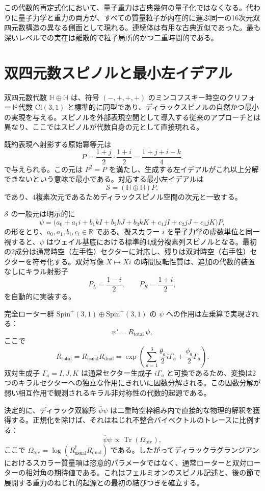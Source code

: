 \documentclass[a4paper]{article}
\begin{document}
この代数的再定式化において、量子重力は古典幾何の量子化ではなくなる。代わりに量子力学と重力の両方が、すべての質量粒子が内在的に運ぶ同一の16次元双四元数構造の異なる側面として現れる。連続体は有用な古典近似であった。最も深いレベルでの実在は離散的で粒子局所的かつ二重時間的である。

\section{双四元数スピノルと最小左イデアル}
\label{sec:spinor}

双四元数代数 $\mathbb{H} \oplus \mathbb{H}$ は、符号 $(-,+,+,+)$ のミンコフスキー時空のクリフォード代数 $\mathrm{Cl}(3,1)$ と標準的に同型であり、ディラックスピノルの自然かつ最小の実現を与える。スピノルを外部表現空間として導入する従来のアプローチとは異なり、ここではスピノルが代数自身の元として直接現れる。

既約表現へ射影する原始冪等元は
\[
P = \frac{1+j}{2} \cdot \frac{1+i}{2} = \frac{1 + j + i - k}{4}.
\]
で与えられる。この元は $P^2 = P$ を満たし、生成する左イデアルがこれ以上分解できないという意味で最小である。対応する最小左イデアルは
\[
\mathcal{S} = (\mathbb{H} \oplus \mathbb{H}) P,
\]
であり、4複素次元であるためディラックスピノル空間の次元と一致する。

$\mathcal{S}$ の一般元は明示的に
\[
\psi = \bigl( a_0 + a_1 i + b_1 kI + b_2 kJ + b_3 kK + c_1 jI + c_2 jJ + c_3 jK \bigr) P,
\]
の形をとり、$a_0,a_1,b_i,c_i \in \mathbb{R}$ である。擬スカラー $i$ を量子力学の虚数単位と同一視すると、$\psi$ はウェイル基底における標準的4成分複素列スピノルとなる。最初の2成分は通常時空（左手性）セクターに対応し、残りは双対時空（右手性）セクターを符号化する。双対写像 $X \mapsto X i$ の時間反転性質は、追加の代数的装置なしにキラル射影子
\[
P_L = \frac{1 - i}{2}, \qquad P_R = \frac{1 + i}{2},
\]
を自動的に実装する。

完全ローター群 $\mathrm{Spin}^+(3,1) \oplus \mathrm{Spin}^+(3,1)$ の $\psi$ への作用は左乗算で実現される：
\[
\psi' = R_\text{total} \, \psi,
\]
ここで
\[
R_\text{total} = R_\text{usual} R_\text{dual} = \exp\left( \sum_{a=1}^3 \frac{\theta_a}{2} i\Gamma_a + \frac{\phi_a}{2} \Gamma_a \right).
\]
双対生成子 $\Gamma_a = I,J,K$ は通常セクター生成子 $i\Gamma_a$ と可換であるため、変換は2つのキラルセクターへの独立な作用にきれいに因数分解される。この因数分解が弱い相互作用で観測されるキラル非対称性の代数的起源である。

決定的に、ディラック双線形 $\bar{\psi}\psi$ は二重時空枠組み内で直接的な物理的解釈を獲得する。正規化を除けば、それはねじれ不整合バイベクトルのトレースに比例する：
\[
\bar{\psi}\psi \propto \operatorname{Tr}(\Omega_\text{biv}),
\]
ここで $\Omega_\text{biv} = \log(R_\text{usual}^\dagger R_\text{dual})$ である。したがってディラックラグランジアンにおけるスカラー質量項は恣意的パラメータではなく、通常ローターと双対ローターの相対角の期待値である。これはフェルミオンのスピノル記述と、後の節で展開する重力のねじれ的起源との最初の結びつきを確立する。
\end{document}
